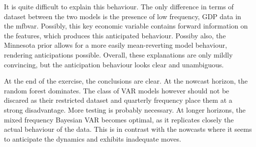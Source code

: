 It is quite difficult to explain this behaviour. The only difference in terms of dataset between the two models is the presence of low frequency, GDP data in the mfbvar. Possibly, this key economic variable contains forward  information on the features, which produces this anticipated behaviour. Possiby also, the Minnesota prior allows for a more easily mean-reverting model behaviour, rendering anticipations possible. Overall, these explanations are only mildly convincing, but the anticipation behaviour looks clear and unambiguous. 

At the end of the exercise, the conclusions are clear. At the nowcast horizon, the random forest dominates. The class of VAR models however should not be discared as their restricted dataset and quarterly frequency place them at a strong disadvantage. More testing is probably necessary. At longer horizons, the mixed frequency Bayesian VAR becomes optimal, as it replicates closely the actual behaviour of the data. This is in contrast with the nowcasts where it seems to anticipate the dynamics and exhibits inadequate moves.






